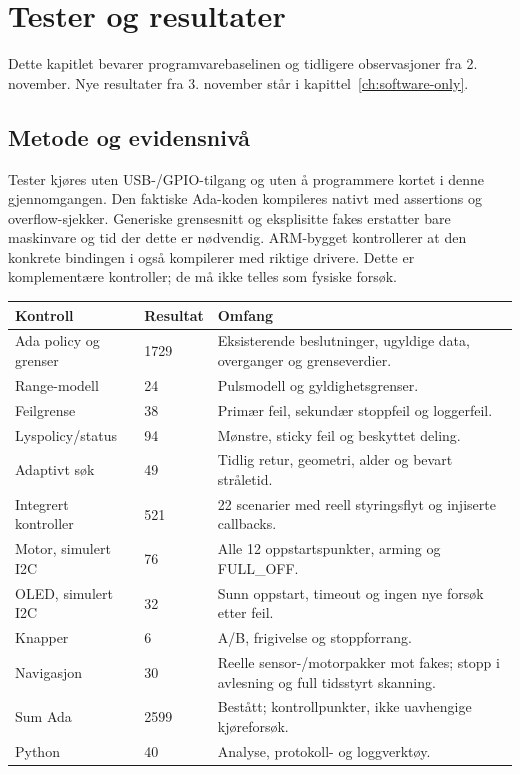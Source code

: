 \chapter{Tester og resultater}
\label{ch:results}
Dette kapitlet bevarer programvarebaselinen og tidligere observasjoner fra
2. november. Nye resultater fra 3. november står i
kapittel~\ref{ch:software-only}.

\section{Metode og evidensnivå}
Tester kjøres uten USB-/GPIO-tilgang og uten å programmere kortet i denne
gjennomgangen. Den faktiske Ada-koden kompileres nativt med assertions og
overflow-sjekker. Generiske grensesnitt og eksplisitte fakes erstatter bare
maskinvare og tid der dette er nødvendig. ARM-bygget kontrollerer at den
konkrete bindingen i  også kompilerer med riktige drivere.
Dette er komplementære kontroller; de må ikke telles som fysiske forsøk.

\begin{tabularx}{\textwidth}{@{}P{41mm}P{18mm}Y@{}}\toprule
Kontroll & Resultat & Omfang\\\midrule
Ada policy og grenser & 1729 & Eksisterende beslutninger, ugyldige data, overganger og grenseverdier.\\
Range-modell & 24 & Pulsmodell og gyldighetsgrenser.\\
Feilgrense & 38 & Primær feil, sekundær stoppfeil og loggerfeil.\\
Lyspolicy/status & 94 & Mønstre, sticky feil og beskyttet deling.\\
Adaptivt søk & 49 & Tidlig retur, geometri, alder og bevart stråletid.\\
Integrert kontroller & 521 & 22 scenarier med reell styringsflyt og injiserte callbacks.\\
Motor, simulert I2C & 76 & Alle 12 oppstartspunkter, arming og FULL\_OFF.\\
OLED, simulert I2C & 32 & Sunn oppstart, timeout og ingen nye forsøk etter feil.\\
Knapper & 6 & A/B, frigivelse og stoppforrang.\\
Navigasjon & 30 & Reelle sensor-/motorpakker mot fakes; stopp i avlesning og full tidsstyrt skanning.\\\midrule
Sum Ada & 2599 & Bestått; kontrollpunkter, ikke uavhengige kjøreforsøk.\\
Python & 40 & Analyse, protokoll- og loggverktøy.\\\bottomrule
\end{tabularx}

